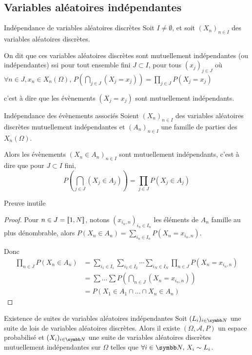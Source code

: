 \subsection{Variables aléatoires indépendantes }

\begin{definition}{Indépendance de variables aléatoires discrètes}{}
    Soit $I \neq \emptyset$, et soit $(X_n)_{n \in I}$ des variables aléatoires discrètes. 

    On dit que ces variables aléatoires discrètes sont mutuellement indépendantes
    (ou indépendantes) ssi pour tout ensemble fini $J \subset I$, pour tous 
    $(x_j)_{j \in J}$ où $\forall n \in J, x_n \in X_n(\Omega)$, 
    $\displaystyle P\left( \bigcap_{j \in J} (X_j = x_j) \right) = \prod_{j \in J} P(X_j = x_j)$

    c'est à dire que les évènements $(X_j = x_j)$ sont mutuellement indépendants.
\end{definition}


\begin{proposition}{Indépendance des évènements associés}{}
    Soient $(X_n)_{n \in I}$ des variables aléatoires discrètes mutuellement indépendantes et 
    $(A_n)_{n \in I}$ une famille de parties des $X_n(\Omega)$. 

    Alors les évènements $(X_n \in A_n)_{n \in I}$ sont mutuellement indépendants, c'est à dire que pour 
    $J \subset I$ fini, $$ P\left( \bigcap_{j \in J} (X_j \in A_j) \right) = \prod_{j \in J} P(X_j \in A_j) $$
\end{proposition}

Preuve inutile 
 
\begin{proof}
    Pour $n \in J = [\![1, N]\!]$, notons 
    $(x_{i_n, n})_{i_n \in I_n}$ les éléments de $A_n$ famille au plus dénombrable, alors 
    $P(X_n \in A_n) = \sum_{i_n \in I_n} P(X_n = x_{i_n, n})$.

    Donc 
    \begin{align}
        \prod_{n \in J} P(X_n \in A_n) & = \sum_{i_1 \in I_1} \sum_{i_2 \in I_2} \cdots \sum_{i_N \in I_N} \prod_{n \in J} P(X_n = x_{i_n, n}) \\
        & = \sum \dots \sum P(\bigcap_{n \in J} (X_n = x_{i_n, n})) \\
        & = P(X_1 \in A_1 \cap \dots \cap X_n \in A_n)
    \end{align}
\end{proof}

\begin{theoreme}{Existence de suites de variables aléatoires indépendantes}{}
    Soit $(L_i)_{i \in \N}$ une suite de lois de variables aléatoires discrètes. Alors il existe 
    $(\Omega, \mathcal A, P)$ un espace probabilisé et $(X_i)_{i \in \N}$ une suite de variables aléatoires discrètes mutuellement indépendantes
    sur $\Omega$ telles que $\forall i \in \N, \, X_i \sim L_i$. 
\end{theoreme}

